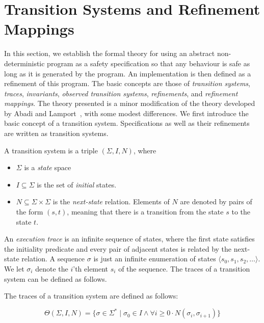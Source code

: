 
\section{Transition Systems and Refinement Mappings}
\label{transition-systems}

In this section,  we establish the  formal theory for using an abstract
non-deterministic program as   a safety specification so  that any
behaviour is safe as long as it is generated by the program.  An implementation
is then defined as  a refinement of  this program.  The basic concepts
are those of {\em transition systems}, {\em traces}, {\em invariants},
{\em  observed  transition   systems},   {\em refinements},   and {\em
  refinement mappings}.  The  theory presented is a minor modification
of the theory developed by Abadi and Lamport~\cite{AL:Mappings}, 
with some modest differences.     We first introduce   the basic concept of  a
transition system.  Specifications as  well as their refinements
are written as transition systems.

\begin{definition}
A transition system is a triple $(\Sigma,I,N)$, where

\begin{itemize}

  \item $\Sigma$ is a {\em state} space

  \item $I \subseteq \Sigma$ is the set of {\em initial} states.

  \item $N \subseteq \Sigma \times \Sigma$ is the {\em next-state} relation.
        Elements of $N$ are denoted by pairs of the form $(s,t)$, meaning that
        there is a transition from the state $s$ to the state $t$.

\end{itemize}
\end{definition}

An {\em execution trace\/}  is an infinite sequence of
states,  where  the first state  satisfies  the initiality predicate and
every pair  of adjacent states is  related  by the  next-state
relation.  A 
sequence $\sigma$  is just an infinite enumeration  of states $\langle s_0,
s_1,  s_2, \ldots \rangle$.     We  let $\sigma_i$ denote  the  $i$'th
element $s_i$  of the  sequence.    The traces of   a transition
system can be defined as follows.

\begin{definition}[Traces]
\label{def-traces}
  The traces of a transition system are defined as follows:

\[
\Theta(\Sigma,I,N) = \{ \sigma \in \Sigma^* \mid 
                          \sigma_0 \in I \wedge
                          \forall i \ge 0 \cdot N(\sigma_i,\sigma_{i+1}) \}
\] 
\end{definition}


